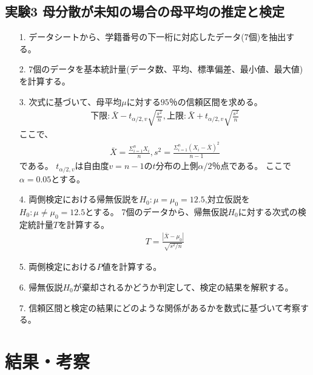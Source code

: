 \documentclass[12pt]{jarticle}
\begin{document}
\subsection{実験3 母分散が未知の場合の母平均の推定と検定}
\begin{itemize}
    \item [1.]データシートから、学籍番号の下一桁に対応したデータ(7個)を抽出する。
    \item [2.]7個のデータを基本統計量(データ数、平均、標準偏差、最小値、最大値)を計算する。
    \item [3.]次式に基づいて、母平均$\mu$に対する$95％$の信頼区間を求める。
          \begin{eqnarray}
              下限:\bar{X}-t_{\alpha/2,v}\sqrt{\frac{s^2}{n}},　上限:\bar{X}+t_{\alpha/2,v}\sqrt{\frac{s^2}{n}}\nonumber
          \end{eqnarray}
          ここで、
          \begin{eqnarray}
              \bar{X}=\frac{\Sigma^{n}_{i=1}X_{i}}{n},　s^2=\frac{\Sigma^{n}_{i=1}{(X_{i}-\bar{X})}^2}{n-1} \nonumber
          \end{eqnarray}
          である。
          $t_{\alpha/2,v}$は自由度$v=n-1$の$t$分布の上側$\alpha/2％$点である。
          ここで$\alpha=0.05$とする。
    \item [4.]両側検定における帰無仮説を$H_0:\mu=\mu_0=12.5$,対立仮説を$H_0:\mu\neq\mu_0=12.5$とする。
          7個のデータから、帰無仮説$H_0$に対する次式の検定統計量$T$を計算する。
          \begin{eqnarray}
              T=\frac{|\bar{X}-\mu_0|}{\sqrt{s^2/n}}\nonumber
          \end{eqnarray}
    \item [5.]両側検定における$P値$を計算する。
    \item [6.]帰無仮説$H_0$が棄却されるかどうか判定して、検定の結果を解釈する。
    \item [7.]信頼区間と検定の結果にどのような関係があるかを数式に基づいて考察する。
\end{itemize}

\section{結果・考察}
\end{document}

